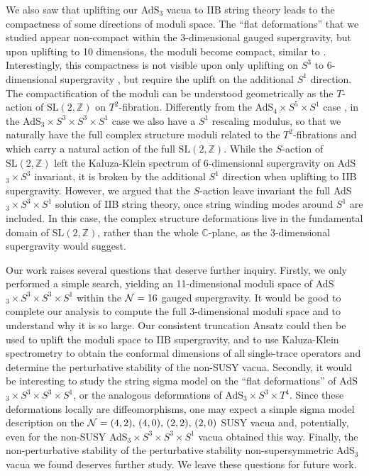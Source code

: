 \documentclass[a4paper, 11pt]{article}
\numberwithin{equation}{section}
\newcommand{\SL}[1]{\mathrm{SL}( #1 )}
\newcommand{\+}{\oplus}
\begin{document}
We also saw that uplifting our AdS$_3$ vacua to IIB string theory leads to the compactness of some directions of moduli space. The ``flat deformations'' that we studied appear non-compact within the 3-dimensional gauged supergravity, but upon uplifting to 10 dimensions, the moduli become compact, similar to \cite{Giambrone:2021zvp,Giambrone:2021wsm}. Interestingly, this compactness is not visible upon only uplifting on $S^3$ to 6-dimensional supergravity \cite{Eloy:2021fhc}, but require the uplift on the additional $S^1$ direction. The compactification of the moduli can be understood geometrically as the $T$-action of $\SL{2,\mathbb{Z}}$ on $T^2$-fibration. Differently from the AdS$_4 \times S^5 \times S^1$ case \cite{Guarino:2021hrc,Giambrone:2021zvp,Giambrone:2021wsm}, in the AdS$_3 \times S^3 \times S^3 \times S^1$ case we also have a $S^1$ rescaling modulus, so that we naturally have the full complex structure moduli related to the $T^2$-fibrations and which carry a natural action of the full $\SL{2,\mathbb{Z}}$. While the $S$-action of $\SL{2,\mathbb{Z}}$ left the Kaluza-Klein spectrum of 6-dimensional supergravity on AdS$_3 \times S^3$ \cite{Eloy:2021fhc} invariant, it is broken by the additional $S^1$ direction when uplifting to IIB supergravity. However, we argued that the $S$-action leave invariant the full AdS$_3 \times S^3 \times S^1$ solution of IIB string theory, once string winding modes around $S^1$ are included. In this case, the complex structure deformations live in the fundamental domain of $\SL{2,\mathbb{Z}}$, rather than the whole $\mathbb{C}$-plane, as the 3-dimensional supergravity would suggest.

Our work raises several questions that deserve further inquiry. Firstly, we only performed a simple search, yielding an 11-dimensional moduli space of AdS$_3 \times S^3 \times S^3 \times S^1$ within the ${\cal N}=16$ gauged supergravity. It would be good to complete our analysis to compute the full 3-dimensional moduli space and to understand why it is so large. Our consistent truncation Ansatz could then be used to uplift the moduli space to IIB supergravity, and to use Kaluza-Klein spectrometry \cite{Malek:2019eaz,Malek:2020yue,Eloy:2020uix} to obtain the conformal dimensions of all single-trace operators and determine the perturbative stability of the non-SUSY vacua. Secondly, it would be interesting to study the string sigma model \cite{Eberhardt:2019niq} on the ``flat deformations'' of AdS$_3 \times S^3 \times S^3 \times S^1$, or the analogous deformations of AdS$_3 \times S^3 \times T^4$. Since these deformations locally are diffeomorphisms, one may expect a simple sigma model description on the ${\cal N}=(4,2),\, (4,0),\, (2,2),\, (2,0)$ SUSY vacua and, potentially, even for the non-SUSY AdS$_3 \times S^3 \times S^3 \times S^1$ vacua obtained this way. Finally, the non-perturbative stability of the perturbative stability non-supersymmetric AdS$_3$ vacua we found deserves further study. We leave these questions for future work.
\end{document}
